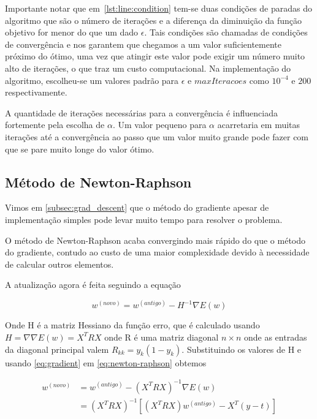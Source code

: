 Importante notar que em~\ref{lst:line:condition} tem-se duas condições de paradas do algoritmo que
são o número de iterações e a diferença da diminuição da função objetivo for menor do que
um dado $\epsilon$. Tais condições são chamadas de condições de convergência e nos garantem
que chegamos a um valor suficientemente próximo do ótimo, uma vez que atingir este valor
pode exigir um número muito alto de iterações, o que traz um custo computacional.
 Na implementação do algoritmo, escolheu-se um valores
padrão para $\epsilon$ e $maxIteracoes$ como $10^{-4}$ e $200$ respectivamente.

A quantidade de iterações necessárias para a convergência é influenciada fortemente pela
escolha de $\alpha$. Um valor pequeno para $\alpha$ acarretaria em muitas iterações até
a convergência ao passo que um valor muito grande pode fazer com que se pare muito longe
do valor ótimo.


\subsection{Método de Newton-Raphson}

Vimos em \ref{subsec:grad_descent} que o método do gradiente apesar de implementação
simples pode levar muito tempo para resolver o problema.

O método de Newton-Raphson acaba convergindo mais rápido do que o método do gradiente,
contudo ao custo de uma maior complexidade devido à necessidade de calcular outros
elementos.

A atualização agora é feita seguindo a equação

\begin{center}
	\begin{equation}\label{eq:newton-raphson}
		w^{ (novo) } = w^{ (antigo) } - H^{-1} \nabla E(w)
	\end{equation}
\end{center}

Onde H é a matriz Hessiano da função erro, que é calculado usando $H = \nabla \nabla E(w)
= X^TRX$ onde R é uma matriz diagonal $n \times n$ onde as entradas da diagonal principal
valem $R_{kk} = y_k(1 - y_k)$. Substituindo os valores de H e usando
\ref{eq:gradient} em \ref{eq:newton-raphson} obtemos


\begin{equation}
\begin{split}
w^{ (novo) } & = w^{ (antigo) } - (X^T R X)^{-1} \nabla E(w) \\
	& = (X^T R X)^{-1}[(X^T R X)w^{ (antigo) } - X^T(y - t)]  
\end{split}
\end{equation}

